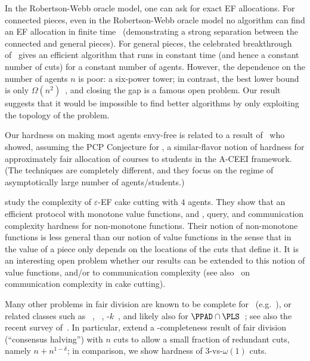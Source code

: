\documentclass[letterpaper,11pt]{article}
\begin{document}
In the Robertson-Webb oracle model, one can ask for exact EF allocations.
For connected pieces, even in the Robertson-Webb oracle model no algorithm can find an EF allocation in finite time~\cite{DBLP:journals/combinatorics/Stromquist08} (demonstrating a strong separation between the connected and general pieces). 
For general pieces, the celebrated breakthrough of~\cite{DBLP:journals/cacm/AzizM20} gives an efficient algorithm that runs in constant time (and hence a constant number of cuts) for a constant number of agents. However, the dependence on the number of agents $n$ is poor: a six-power tower; in contrast, the best lower bound is only $\Omega(n^2)$~\cite{DBLP:conf/ijcai/Procaccia09}, and closing the gap is a famous open problem. Our result suggests that it would be impossible to find better algorithms by only exploiting the topology of the problem. 

Our hardness on making most agents envy-free is related to a result of~\cite{DBLP:conf/innovations/BabichenkoPR16} who showed, assuming the PCP Conjecture for \PPAD, a similar-flavor notion of hardness for approximately fair allocation of courses to students in the A-CEEI framework. (The techniques are completely different, and they focus on the regime of asymptotically large number of agents/students.)

\cite{DBLP:conf/focs/HollenderR23} study the complexity of $\varepsilon$-EF cake cutting with $4$ agents. They show that an efficient protocol with monotone value functions, and \PPAD, query, and communication complexity hardness for non-monotone functions. Their notion of non-monotone functions is less general than our notion of value functions in the sense that in~\cite{DBLP:conf/focs/HollenderR23} the value of a piece only depends on the locations of the cuts that define it. It is an interesting open problem whether our results can be extended to this notion of value functions, and/or to communication complexity (see also~\cite{DBLP:conf/ec/BranzeiN19} on communication complexity in cake cutting).

Many other problems in fair division are known to be complete for \PPAD~(e.g.~\cite{DBLP:journals/teco/OthmanPR16,DBLP:journals/corr/abs-2008-00285}), or related classes such as \PPA~\cite{DBLP:conf/stoc/Filos-RatsikasG18, DBLP:conf/stoc/DeligkasFHM22, DBLP:journals/ai/DeligkasFH22}, \PLS~\cite{DBLP:conf/sagt/GoldbergHH23}, \PPA-$k$~\cite{DBLP:conf/soda/Filos-RatsikasH21}, and likely also  for $\PPAD \cap \PLS$~\cite{DBLP:conf/soda/Arunachaleswaran19}; see also the recent survey of~\cite{DBLP:journals/ai/AmanatidisABFLMVW23}. In particular, \cite{DBLP:conf/stoc/DeligkasFHM22} extend a \PPA-completeness result of fair division (``consensus halving'') with $n$ cuts to allow a small fraction of redundant cuts, namely $n+n^{1-\delta}$; in comparison, we show hardness of $3$-vs-$\omega(1)$ cuts. 
\end{document}
